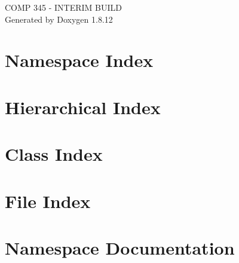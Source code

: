 \documentclass[twoside]{book}
\newcommand{\+}{\discretionary{\mbox{\scriptsize$\hookleftarrow$}}{}{}}
\newcommand{\clearemptydoublepage}{%
  \newpage{\pagestyle{empty}\cleardoublepage}%
}
\begin{document}
\hypersetup{pageanchor=false,
             bookmarksnumbered=true,
             pdfencoding=unicode
            }
\begin{titlepage}
\vspace*{7cm}
\begin{center}%
{\Large C\+O\+MP 345 -\/ I\+N\+T\+E\+R\+IM B\+U\+I\+LD }\\
\vspace*{1cm}
{\large Generated by Doxygen 1.8.12}\\
\end{center}
\end{titlepage}
\clearemptydoublepage
{}
\tableofcontents
\clearemptydoublepage
{}
\hypersetup{pageanchor=true}

\chapter{Namespace Index}

\chapter{Hierarchical Index}

\chapter{Class Index}

\chapter{File Index}

\chapter{Namespace Documentation}










\end{document}
